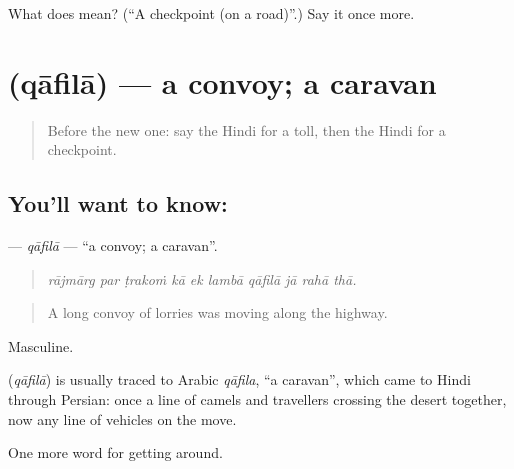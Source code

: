 \begin{tcolorbox}[breakable,colback=teal!4,colframe=teal!35!black,title={Before you move on}]
What does  mean? (\textquotedblleft{}A checkpoint (on a road)\textquotedblright{}.) Say it once more.
\end{tcolorbox}
\section[\texorpdfstring{\hi{क़ाफ़िला} (qāfilā)}{क़ाफ़िला (qāfilā)}]{ (qāfilā) — a convoy; a caravan}

\label{lesson:HI-C407-qafila}



\begin{quote}
Before the new one: say the Hindi for a toll, then the Hindi for a checkpoint.
\end{quote}

\subsection*{You'll want to know: }
\textbf{} — \emph{qāfilā} — \textquotedblleft{}a convoy; a caravan\textquotedblright{}.

\begin{quote}
         
\end{quote}

\begin{quote}
\emph{rājmārg par ṭrakoṁ kā ek lambā qāfilā jā rahā thā.}
\end{quote}

\begin{quote}
A long convoy of lorries was moving along the highway.
\end{quote}

Masculine.

\begin{cousinweb}
\textbf{} (\emph{qāfilā}) is usually traced to Arabic \emph{qāfila}, \textquotedblleft{}a caravan\textquotedblright{}, which came to Hindi through Persian: once a line of camels and travellers crossing the desert together, now any line of vehicles on the move.
\end{cousinweb}

\begin{grammarlens}[title={What you've built}]
One more word for getting around.
\end{grammarlens}

